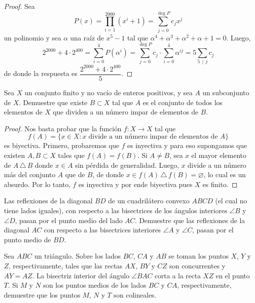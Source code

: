 \begin{proof}
	Sea
	\[P(x)=\prod_{i=1}^{2000}(x^i+1)=\sum_{j=0}^{\deg P}c_jx^j\]
	un polinomio y sea $\alpha$ una raíz de $x^5-1$ tal que $\alpha^4+\alpha^3+\alpha^2+\alpha+1=0$. Luego,
	\[2^{2000}+4\cdot 2^{400}=\sum_{i=0}^4 P(\alpha^i)=\sum_{j=0}^{\deg P}c_j\cdot\sum_{i=0}^4\alpha^{ij}=5\sum_{5\,\mid\,j}c_j\]
	de donde la respuesta es $\dfrac{2^{2000}+4\cdot 2^{400}}{5}$.
\end{proof}

\begin{probEG}
	Sea $X$ un conjunto finito y no vacío de enteros positivos, y sea $A$ un subconjunto de $X$. Demuestre que existe $B\subset X$ tal que $A$ es el conjunto de todos los elementos de $X$ que dividen a un número impar de elementos de $B$.
\end{probEG}

\begin{proof}
	Nos basta probar que la función $f:X\to X$ tal que
	\[f(A)=\{x\in X:x\text{ divide a un número impar de elementos de }A\}\]
	es biyectiva. Primero, probaremos que $f$ es inyectiva y para eso supongamos que existen $A,B\subset X$ tales que $f(A)=f(B)$. Si $A\ne B$, sea $x$ el mayor elemento de $A\,\triangle\,B$ donde $x\in A$ sin pérdida de generalidad. Luego, $x$ divide a un número más del conjunto $A$ que de $B$, de donde $x\in f(A)\,\triangle\,f(B)=\varnothing$, lo cual es un absurdo. Por lo tanto, $f$ es inyectiva y por ende biyectiva pues $X$ es finito.
\end{proof}


\begin{probEG}
	Las reflexiones de la diagonal $BD$ de un cuadrilátero convexo $ABCD$ (el cual no tiene lados iguales), con respecto a las bisectrices de los ángulos interiores $\angle B$ y $\angle D$, pasan por el punto medio del lado $AC$. Demuestre que las reflexiones de la diagonal $AC$ con respecto a las bisectrices interiores $\angle A$ y $\angle C$, pasan por el punto medio de $BD$.
\end{probEG}

\begin{probEG}
	Sea $ABC$ un triángulo. Sobre los lados $BC$, $CA$ y $AB$ se toman los puntos $X$, $Y$ y $Z$, respectivamente, tales que las rectas $AX$, $BY$ y $CZ$ son concurrentes y $AY=AZ$. La bisectriz interior del ángulo $\angle BAC$ corta a la recta $XZ$ en el punto $T$. Si $M$ y $N$ son los puntos medios de los lados $BC$ y $CA$, respectivamente, demuestre que los puntos $M$, $N$ y $T$ son colineales.
\end{probEG}

